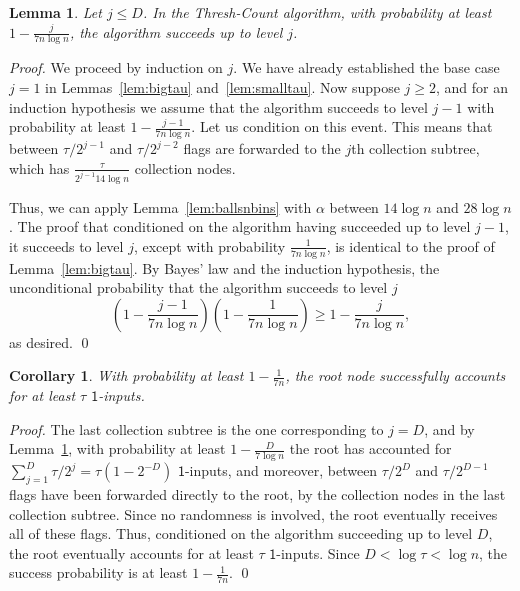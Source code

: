 \documentclass[11pt,letter]{article}
\newcommand{\alg}[1]{\mbox{\textsf{#1}}}
\theoremstyle{mytheoremstyle}
\newtheorem{lemma}{Lemma}
\newtheorem{corollary}{Corollary}
\newcommand{\dcl}{D}
\newcommand{\oneinputs}{$\mathsf{1}$-inputs\xspace}
\begin{document}
\begin{lemma} \label{lem:successj}
	Let $j \le \dcl$.
	In the \alg{Thresh-Count} algorithm, with probability at least $1 - \frac{j}{7n\log{n}}$, the algorithm succeeds up to level $j$.
\end{lemma}
\begin{proof}
	We proceed by induction on $j$.
	We have already established the base case $j=1$ in Lemmas~\ref{lem:bigtau}
	and~\ref{lem:smalltau}.
	Now suppose $j \ge 2$, and for an induction hypothesis we assume that the algorithm succeeds to level $j-1$ with probability at least $1- \frac{j-1}{7n\log{n}}$. Let us condition on this event. This means that between $\tau/2^{j-1}$ and $\tau/2^{j-2}$ flags are forwarded to the $j$th collection subtree, which has $\frac{\tau}{2^{j-1}14\log{n}}$ collection nodes.
	
	Thus, we can apply Lemma~\ref{lem:ballsnbins} with $\alpha$ between $14\log{n}$ and $28\log{n}$. The proof that conditioned on the algorithm having succeeded up to level $j-1$, it succeeds to level $j$, except with probability $\frac{1}{7n\log{n}}$, is identical to the proof of Lemma~\ref{lem:bigtau}. By Bayes' law and the induction hypothesis, the unconditional probability that the algorithm succeeds to level $j$
	\[
	\left(1- \frac{j-1}{7n\log{n}}\right)\left(1-\frac{1}{7n\log{n}}\right) \ge 1-\frac{j}{7n\log{n}},
	\]
	as desired.
	\qed
\end{proof}

\begin{corollary}\label{cor:successroot}
	With probability at least $1 - \frac{1}{7n}$, the root node successfully accounts for at least $\tau$ \oneinputs.
\end{corollary}
\begin{proof}
	The last collection subtree is the one corresponding to $j= \dcl$, and by Lemma~\ref{lem:successj}, with probability at least $1- \frac{\dcl}{7\log{n}}$ the root has accounted for $\sum_{j=1}^{\dcl}\tau/2^j = \tau(1-2^{-\dcl})$
	\oneinputs, and moreover, between $\tau/2^{\dcl}$ and $\tau/2^{\dcl-1}$ flags have been forwarded directly to the root, by the collection nodes in the last collection subtree. Since no randomness is involved, the root eventually receives all of these flags.
	Thus, conditioned on the algorithm succeeding up to level $\dcl$, the root eventually accounts for at least $\tau$ \oneinputs. Since $\dcl < \log \tau <\log n$, the success probability is at least $1-\frac1{7n}$.
	\qed
\end{proof}
\end{document}

